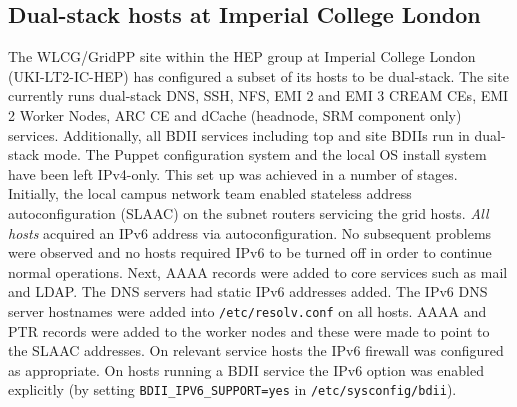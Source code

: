 \subsection{Dual-stack hosts at Imperial College London}
The WLCG/GridPP site within the HEP group at Imperial College London (UKI-LT2-IC-HEP) has configured a subset of its hosts to be dual-stack. 
The site currently runs dual-stack DNS, SSH, NFS, EMI 2 and EMI 3 CREAM CEs, EMI 2 Worker Nodes, 
ARC CE and dCache (headnode, SRM component only) services.
Additionally, all BDII services including top and site BDIIs run in dual-stack mode. The Puppet configuration system and the local OS install system have been left IPv4-only.
This set up was achieved in a number of stages. Initially, the local campus network team enabled 
stateless address autoconfiguration (SLAAC) on the subnet routers servicing the grid hosts. {\em All hosts} acquired an IPv6 address via autoconfiguration. 
No subsequent problems were observed and no hosts required IPv6 to be turned off in order to continue normal operations. 
Next, AAAA records were added to core services such as mail and LDAP. The DNS servers had static IPv6 addresses added. 
The IPv6 DNS server hostnames were added into {\tt /etc/resolv.conf} on all hosts. AAAA and PTR records were added to the worker nodes and these were made to point to the SLAAC addresses. 
On relevant service hosts the IPv6 firewall was configured as appropriate. On hosts running a BDII service the IPv6 option was enabled explicitly 
(by setting {\tt BDII\_IPV6\_SUPPORT=yes} in {\tt /etc/sysconfig/bdii}).
